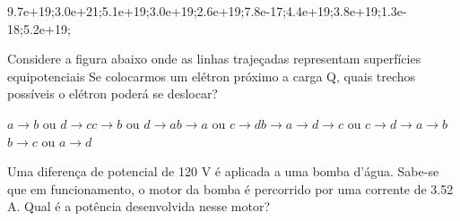 \documentclass[12pt, addpoints]{exam}
\begin{document}
\begin{questions}
\begin{multicols*}{2}
\begin{oneparchoices}
\choice 9.7e+19;\choice 3.0e+21;\choice 5.1e+19;\choice 3.0e+19;\choice 2.6e+19;\choice 7.8e-17;\choice 4.4e+19;\choice 3.8e+19;\choice 1.3e-18;\choice 5.2e+19;\end{oneparchoices}
\question[20] Considere a figura abaixo onde as linhas trajeçadas representam superfícies equipotenciais Se colocarmos um elétron próximo a carga Q, quais trechos possíveis o elétron poderá se deslocar?
        
        \begin{center}
            \begin{minipage}[c]{0.5\linewidth}
            \end{minipage}
        \end{center}
        
        

\begin{choices}
\choice $a\rightarrow b$ ou $d\rightarrow c$\choice $c\rightarrow b$ ou $d\rightarrow a$\choice $b\rightarrow a$ ou $c\rightarrow d$\choice $b\rightarrow a\rightarrow d\rightarrow c$ ou $c\rightarrow d\rightarrow a\rightarrow b$\choice $b\rightarrow c$ ou $a\rightarrow d$\end{choices}
\question[20] Uma diferença de potencial de 120 V é aplicada a uma bomba d’água. Sabe-se que em funcionamento, o motor da bomba é percorrido por uma corrente de    3.52 A. Qual é a potência desenvolvida nesse motor?


\end{multicols*}
\end{questions}
\end{document}
